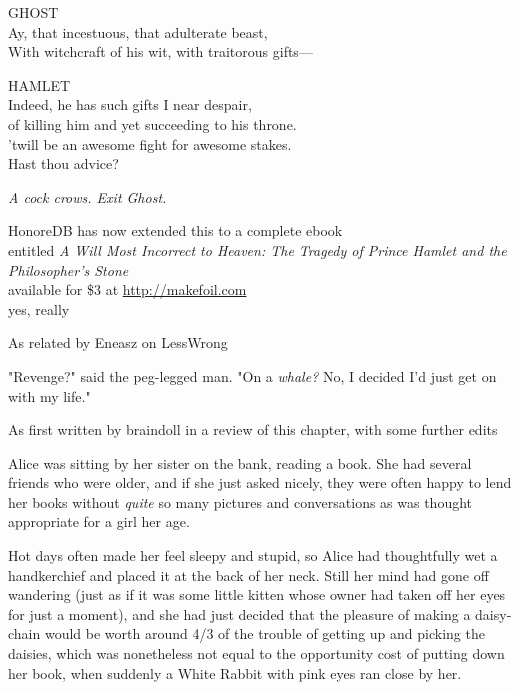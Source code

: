 \bigskip
\noindent{}GHOST\\
Ay, that incestuous, that adulterate beast,\\
With witchcraft of his wit, with traitorous gifts---

\bigskip
\noindent{}HAMLET\\
Indeed, he has such gifts I near despair,\\
of killing him and yet succeeding to his throne.\\
'twill be an awesome fight for awesome stakes.\\
Hast thou advice?

\bigskip
\emph{A cock crows. Exit Ghost.}

\begin{center}
    \small
HonoreDB has now extended this to a complete ebook\\
entitled \emph{A Will Most Incorrect to Heaven: The Tragedy of Prince Hamlet and
the Philosopher's Stone}\\
available for \$3 at \url{http://makefoil.com}\\
yes, really
\end{center}
\vspace{-\baselineskip}
\sbreak
{}
\begin{center}
    \small
    As related by Eneasz on LessWrong
\end{center}

\noindent{}"Revenge?" said the peg-legged man. "On a \emph{whale?} No, I decided I'd just
get on with my life."
\sbreak
{}
\begin{center}
    \small
    As first written by braindoll in a review of this chapter, with some
    further edits
\end{center}

\noindent{}Alice was sitting by her sister on the bank, reading a book. She had several
friends who were older, and if she just asked nicely, they were often happy to
lend her books without \emph{quite} so many pictures and conversations as was
thought appropriate for a girl her age.

Hot days often made her feel sleepy and stupid, so Alice had thoughtfully wet a
handkerchief and placed it at the back of her neck. Still her mind had gone off
wandering (just as if it was some little kitten whose owner had taken off her
eyes for just a moment), and she had just decided that the pleasure of making a
daisy-chain would be worth around 4/3 of the trouble of getting up and picking
the daisies, which was nonetheless not equal to the opportunity cost of putting
down her book, when suddenly a White Rabbit with pink eyes ran close by her.

